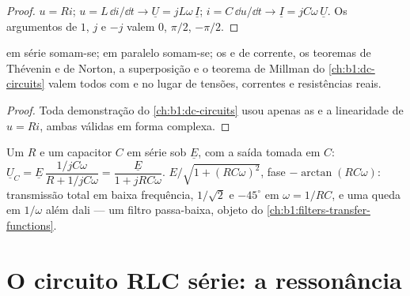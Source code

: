 \begin{proof}
$u = Ri$; $u = L\,\dd i/\dd t \to \underline U = jL\omega\,\underline I$;
$i = C\,\dd u/\dd t \to \underline I = jC\omega\,\underline U$. Os
argumentos de $1$, $j$ e $-j$ valem $0$, $\pi/2$, $-\pi/2$.
\end{proof}

\begin{proposition}\label{prop:b1:sinusoidal-impedance:assoc}
 em série somam-se;  em paralelo somam-se; os  e de corrente, os teoremas de Thévenin e de Norton, a superposição e
o teorema de Millman do \cref{ch:b1:dc-circuits} valem todos com  e  no lugar de tensões, correntes e
resistências reais.
\end{proposition}

\begin{proof}
Toda demonstração do \cref{ch:b1:dc-circuits} usou apenas as  e
a linearidade de $u = Ri$, ambas válidas em forma complexa.
\end{proof}

\begin{example}[O divisor RC]\label{ex:b1:sinusoidal-impedance:rcdivider}
Um  $R$ e um capacitor $C$ em série sob $\underline E$, com a
saída tomada em $C$: $\underline U_C = \underline E\,\dfrac{1/jC\omega}
{R + 1/jC\omega} = \dfrac{\underline E}{1 + jRC\omega}$. 
$E/\sqrt{1 + (RC\omega)^2}$, fase $-\arctan(RC\omega)$: transmissão
total em baixa frequência, $1/\sqrt2$ e $-45^\circ$ em
$\omega = 1/RC$, e uma queda em $1/\omega$ além dali --- um filtro passa-baixa,
objeto do \cref{ch:b1:filters-transfer-functions}.
\end{example}

\section{O circuito RLC série: a ressonância}

